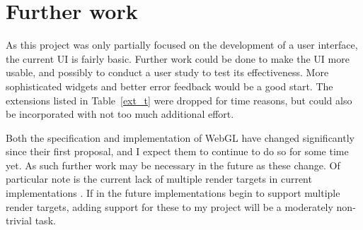 \documentclass[12pt,twoside,notitlepage]{report}
\begin{document}
\section{Further work}
As this project was only partially focused on the development of a user interface, the current UI is fairly basic. Further work could be done to make the UI more usable, and possibly to conduct a user study to test its effectiveness. More sophisticated widgets and better error feedback would be a good start. The extensions listed in Table~\ref{ext_t} were dropped for time reasons, but could also be incorporated with not too much additional effort.

Both the specification and implementation of WebGL have changed significantly since their first proposal, and I expect them to continue to do so for some time yet. As such further work may be necessary in the future as these change. Of particular note is the current lack of multiple render targets in current implementations \cite{webgl-future}. If in the future implementations begin to support multiple render targets, adding support for these to my project will be a moderately non-trivial task.

\cleardoublepage



\cleardoublepage

\appendix




\end{document}
